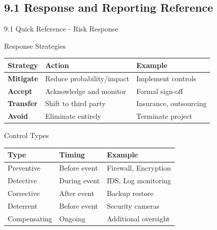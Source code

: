 \documentclass{beamer}
\begin{document}
	\subsection{9.1 Response and Reporting Reference}
	\begin{frame}{9.1 Quick Reference - Risk Response}
		\begin{block}{Response Strategies}
			\begin{tabular}{|p{2.5cm}|p{4cm}|p{4.5cm}|}
				\hline
				\textbf{Strategy} & \textbf{Action} & \textbf{Example} \\
				\hline
				\textbf{Mitigate} & Reduce probability/impact & Implement controls \\
				\hline
				\textbf{Accept} & Acknowledge and monitor & Formal sign-off \\
				\hline
				\textbf{Transfer} & Shift to third party & Insurance, outsourcing \\
				\hline
				\textbf{Avoid} & Eliminate entirely & Terminate project \\
				\hline
			\end{tabular}
		\end{block}
		
		\begin{block}{Control Types}
			\begin{tabular}{|p{2.5cm}|p{4cm}|p{4.5cm}|}
				\hline
				\textbf{Type} & \textbf{Timing} & \textbf{Example} \\
				\hline
				Preventive & Before event & Firewall, Encryption \\
				\hline
				Detective & During event & IDS, Log monitoring \\
				\hline
				Corrective & After event & Backup restore \\
				\hline
				Deterrent & Before event & Security cameras \\
				\hline
				Compensating & Ongoing & Additional oversight \\
				\hline
			\end{tabular}
		\end{block}
	\end{frame}
	
\end{document}
